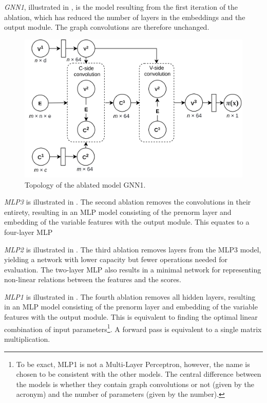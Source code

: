 \textit{GNN1}, illustrated in , is the model resulting from the first iteration of the ablation, which has reduced the number of layers in the embeddings and the output module. The graph convolutions are therefore unchanged.

\begin{figure}
    \centering
    \includegraphics[width=\linewidth]{img/gnn1.png}
    \caption{Topology of the ablated model GNN1.}
    \label{fig:gnn1}
\end{figure}

\textit{\gls{MLP}3} is illustrated in . The second ablation removes the convolutions in their entirety, resulting in an \gls{MLP} model consisting of the prenorm layer and embedding of the variable features with the output module. This equates to a four-layer \gls{MLP}


\textit{\gls{MLP}2} is illustrated in . The third ablation removes layers from the MLP3 model, yielding a network with lower capacity but fewer operations needed for evaluation. The two-layer \gls{MLP} also results in a minimal network for representing non-linear relations between the features and the scores. 


\textit{\gls{MLP}1} is illustrated in . The fourth ablation removes all hidden layers, resulting in an \gls{MLP} model consisting of the prenorm layer and embedding of the variable features with the output module. This is equivalent to finding the optimal linear combination of input parameters\footnote{To be exact, MLP1 is not a Multi-Layer Perceptron, however, the name is chosen to be consistent with the other models. The central difference between the models is whether they contain graph convolutions or not (given by the acronym) and the number of parameters (given by the number).}. A forward pass is equivalent to a single matrix multiplication. 


